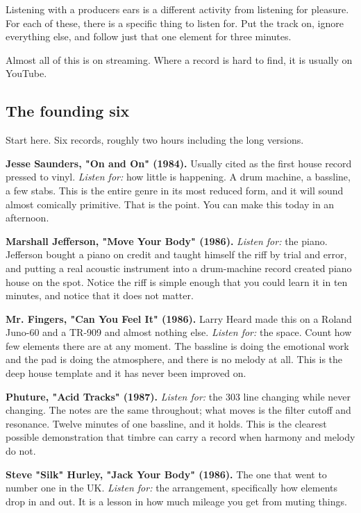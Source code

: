 Listening with a producer\textquotesingle s ears is a different activity from listening for pleasure. For
each of these, there is a specific thing to listen for. Put the track on, ignore everything
else, and follow just that one element for three minutes.

Almost all of this is on streaming. Where a record is hard to find, it is usually on
YouTube.

\subsection{The founding six}\label{li01_canon-the-founding-six}

Start here. Six records, roughly two hours including the long versions.

\textbf{Jesse Saunders, "On and On" (1984).} Usually cited as the first house record pressed to
vinyl. \emph{Listen for:} how little is happening. A drum machine, a bassline, a few stabs. This
is the entire genre in its most reduced form, and it will sound almost comically primitive.
That is the point. You can make this today in an afternoon.

\textbf{Marshall Jefferson, "Move Your Body" (1986).} \emph{Listen for:} the piano. Jefferson bought
a piano on credit and taught himself the riff by trial and error, and putting a real acoustic
instrument into a drum-machine record created piano house on the spot. Notice the riff is
simple enough that you could learn it in ten minutes, and notice that it does not matter.

\textbf{Mr. Fingers, "Can You Feel It" (1986).} Larry Heard made this on a Roland Juno-60 and a
TR-909 and almost nothing else. \emph{Listen for:} the space. Count how few elements there are at
any moment. The bassline is doing the emotional work and the pad is doing the atmosphere,
and there is no melody at all. This is the deep house template and it has never been
improved on.

\textbf{Phuture, "Acid Tracks" (1987).} \emph{Listen for:} the 303 line changing while never changing.
The notes are the same throughout; what moves is the filter cutoff and resonance. Twelve
minutes of one bassline, and it holds. This is the clearest possible demonstration that
timbre can carry a record when harmony and melody do not.

\textbf{Steve "Silk" Hurley, "Jack Your Body" (1986).} The one that went to number one in the UK.
\emph{Listen for:} the arrangement, specifically how elements drop in and out. It is a lesson in
how much mileage you get from muting things.

